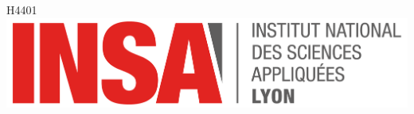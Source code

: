 \documentclass[12pt]{article}
\begin{document}
\begin{titlepage}
H4401\\[2cm]

\includegraphics[scale=0.3]{figures/logo.png}

\vfill %

\end{titlepage}
\end{document}
